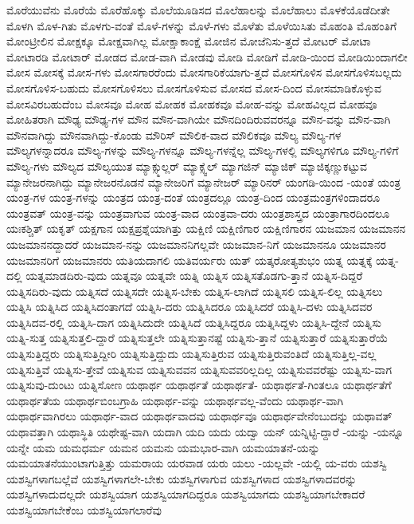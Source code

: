 {ಮೊರೆಯುವೆನು
ಮೊರೆಯೆ
ಮೊರೆಹೊಕ್ಕು
ಮೊಲೆಯೂಡಿಸದ
ಮೊಲೆಹಾಲನ್ನು
ಮೊಲೆಹಾಲು
ಮೊಳಕೆಯೊಡೆದೀತೇ
ಮೊಳಗಿ
ಮೊಳ-ಗಿತು
ಮೊಳಗು-ವಂತೆ
ಮೊಳೆ-ಗಳನ್ನು
ಮೊಳೆ-ಗಳು
ಮೊಳೆತು
ಮೊಳೆಯಿಸಿತು
ಮೊಹಂತಿ
ಮೊಹಂತಿಗೆ
ಮೋಂಟ್ರೀಲಿನ
ಮೋಕ್ಷಕ್ಕೂ
ಮೋಕ್ಷವಾಗಿಲ್ಲ
ಮೋಕ್ಷಾಕಾಂಕ್ಷೆ
ಮೋಜಿನ
ಮೋಜೆನಿಸು-ತ್ತದೆ
ಮೋಟರ್
ಮೋಟಾ
ಮೋಟಾರಡಿ
ಮೋಟಾರ್
ಮೋಡದ
ಮೋಡ-ವಾಗಿ
ಮೋಡವು
ಮೋಡಿ
ಮೋಡಿಗೆ
ಮೋಡಿ-ಯಿಂದ
ಮೋಡಿಯಿಂದಾಗಲೀ
ಮೋಸ
ಮೋಸಕ್ಕೆ
ಮೋಸ-ಗಳು
ಮೋಸಗಾರರೆಂದು
ಮೋಸಗಾರಿಕೆಯಾಗು-ತ್ತದೆ
ಮೋಸಗೊಳಿಸ
ಮೋಸಗೊಳಿಸಬಲ್ಲದು
ಮೋಸಗೊಳಿಸ-ಬಹುದು
ಮೋಸಗೊಳಿಸಲು
ಮೋಸಗೊಳಿಸುವ
ಮೋಸದ
ಮೋಸ-ದಿಂದ
ಮೋಸಮಾಡಿಕೊಳ್ಳುವ
ಮೋಸವಿರಬಹುದೆಂಬ
ಮೋಸವೂ
ಮೋಹ
ಮೋಹಕ
ಮೋಹಕವೂ
ಮೋಹ-ವನ್ನು
ಮೋಹವಿಲ್ಲದ
ಮೋಹವೂ
ಮೋಹಿತರಾಗಿ
ಮೌಢ್ಯ
ಮೌಢ್ಯ-ಗಳ
ಮೌನ
ಮೌನ-ವಾಗಿಯೇ
ಮೌನದಿಂದಿರುವವರನ್ನೂ
ಮೌನ-ವನ್ನು
ಮೌನ-ವಾಗಿ
ಮೌನವಾಗಿದ್ದು
ಮೌನವಾಗಿದ್ದು-ಕೊಂಡು
ಮೌರಿಸ್
ಮೌಲಿಕ-ವಾದ
ಮೌಲಿಕವೂ
ಮೌಲ್ಯ
ಮೌಲ್ಯ-ಗಳ
ಮೌಲ್ಯಗಳನ್ನಾದರೂ
ಮೌಲ್ಯ-ಗಳನ್ನು
ಮೌಲ್ಯ-ಗಳನ್ನೂ
ಮೌಲ್ಯ-ಗಳನ್ನೆಲ್ಲ
ಮೌಲ್ಯ-ಗಳಲ್ಲಿ
ಮೌಲ್ಯಗಳಿಗೂ
ಮೌಲ್ಯ-ಗಳಿಗೆ
ಮೌಲ್ಯ-ಗಳು
ಮೌಲ್ಯದ
ಮೌಲ್ಯಯುತ
ಮ್ಯಾಕ್ಸ್ಮುಲ್ಲರ್
ಮ್ಯಾಕ್ಸ್ವೆಲ್
ಮ್ಯಾಗಜಿನ್
ಮ್ಯಾಜಿಕ್
ಮ್ಯಾಜಿಕ್ಕಣ್ಣುಕಟ್ಟುವ
ಮ್ಯಾನೇಜರನಾಗಿದ್ದು
ಮ್ಯಾನೇಜರನೊಡನೆ
ಮ್ಯಾನೇಜರಿಗೆ
ಮ್ಯಾನೇಜರ್
ಮ್ಯಾರಿನರ್
ಯಂಗಡಿ-ಯಿಂದ
-ಯಂತೆ
ಯಂತ್ರ
ಯಂತ್ರ-ಗಳ
ಯಂತ್ರ-ಗಳನ್ನು
ಯಂತ್ರದ
ಯಂತ್ರ-ದಂತೆ
ಯಂತ್ರದಲ್ಲೂ
ಯಂತ್ರ-ದಿಂದ
ಯಂತ್ರಮಂತ್ರಗಳಿಂದಾದರೂ
ಯಂತ್ರವತ್
ಯಂತ್ರ-ವನ್ನು
ಯಂತ್ರವಾಗುವ
ಯಂತ್ರ-ವಾದ
ಯಂತ್ರವಾ-ದರು
ಯಂತ್ರಶಾಸ್ತ್ರದ
ಯಂತ್ರಾಗಾರದಿಂದಲೂ
ಯಃಕಶ್ಚಿತ್
ಯಕೃತ್
ಯಕ್ಷಗಾನ
ಯಕ್ಷಪ್ರಶ್ನೆಯಾಗಿತ್ತು
ಯಕ್ಷಿಣಿ
ಯಕ್ಷಿಣಿಗಾರ
ಯಕ್ಷಿಣಿಗಾರನ
ಯಜಮಾನ
ಯಜಮಾನನ
ಯಜಮಾನನದ್ದಾದರೆ
ಯಜಮಾನ-ನನ್ನು
ಯಜಮಾನನಿಗಲ್ಲವೇ
ಯಜಮಾನ-ನಿಗೆ
ಯಜಮಾನನೂ
ಯಜಮಾನರ
ಯಜಮಾನರಿಗೆ
ಯಜಮಾನರು
ಯತಿಯದಾಗಲಿ
ಯತಿವರ್ಯರು
ಯತ್
ಯತ್ಕರೋತ್ಯಶುಭಂ
ಯತ್ನ
ಯತ್ನಕ್ಕೆ
ಯತ್ನ-ದಲ್ಲಿ
ಯತ್ನಮಾಡದಿರು-ವುದು
ಯತ್ನವೂ
ಯತ್ನವೇ
ಯತ್ನಿ
ಯತ್ನಿಸ
ಯತ್ನಿಸತೊಡಗು-ತ್ತಾನೆ
ಯತ್ನಿಸ-ದಿದ್ದರೆ
ಯತ್ನಿಸದಿರು-ವುದು
ಯತ್ನಿಸದೆ
ಯತ್ನಿಸದೇ
ಯತ್ನಿಸ-ಬೇಕು
ಯತ್ನಿಸ-ಲಾಗಿದೆ
ಯತ್ನಿಸಲಿ
ಯತ್ನಿಸ-ಲಿಲ್ಲ
ಯತ್ನಿಸಲು
ಯತ್ನಿಸಿ
ಯತ್ನಿಸಿದ
ಯತ್ನಿಸಿದಂತಾಗದೆ
ಯತ್ನಿಸಿ-ದರು
ಯತ್ನಿಸಿದರೂ
ಯತ್ನಿಸಿದರೆ
ಯತ್ನಿಸಿ-ದಳು
ಯತ್ನಿಸಿದವರ
ಯತ್ನಿಸಿದವ-ರಲ್ಲಿ
ಯತ್ನಿಸಿ-ದಾಗ
ಯತ್ನಿಸಿದುದೇ
ಯತ್ನಿಸಿದೆ
ಯತ್ನಿಸಿದ್ದರೂ
ಯತ್ನಿಸಿದ್ದಳು
ಯತ್ನಿಸಿ-ದ್ದೇನೆ
ಯತ್ನಿಸು
ಯತ್ನಿ-ಸುತ್ತ
ಯತ್ನಿಸುತ್ತಲಿ-ದ್ದಾರೆ
ಯತ್ನಿಸುತ್ತಲೇ
ಯತ್ನಿಸುತ್ತಾನಷ್ಟೆ
ಯತ್ನಿಸು-ತ್ತಾನೆ
ಯತ್ನಿಸುತ್ತಾರೆ
ಯತ್ನಿಸುತ್ತಾರೆಯೆ
ಯತ್ನಿಸುತ್ತಿದ್ದರು
ಯತ್ನಿಸುತ್ತಿದ್ದೀರಿ
ಯತ್ನಿಸುತ್ತಿದ್ದುದು
ಯತ್ನಿಸುತ್ತಿರುವ
ಯತ್ನಿಸುತ್ತಿರುವಂತಿದೆ
ಯತ್ನಿಸುತ್ತಿಲ್ಲ-ವಲ್ಲ
ಯತ್ನಿಸುತ್ತಿವೆ
ಯತ್ನಿಸು-ತ್ತೇವೆ
ಯತ್ನಿಸುವ
ಯತ್ನಿಸುವವನ
ಯತ್ನಿಸುವವರಿಲ್ಲದಿಲ್ಲ
ಯತ್ನಿಸುವವರೆಷ್ಟು
ಯತ್ನಿಸು-ವಾಗ
ಯತ್ನಿಸುವು-ದುಂಟು
ಯತ್ನಿಸೋಣ
ಯಥಾರ್ಥ
ಯಥಾರ್ಥತೆ
ಯಥಾರ್ಥತೆ-
ಯಥಾರ್ಥತೆ-ಗಿಂತಲೂ
ಯಥಾರ್ಥತೆಗೆ
ಯಥಾರ್ಥತೆಯ
ಯಥಾರ್ಥಬಿಂಬಗ್ರಾಹಿ
ಯಥಾರ್ಥ-ವನ್ನು
ಯಥಾರ್ಥವಲ್ಲ-ವೆಂದು
ಯಥಾರ್ಥ-ವಾಗಿ
ಯಥಾರ್ಥವಾಗಿರಲು
ಯಥಾರ್ಥ-ವಾದ
ಯಥಾರ್ಥವಾದವು
ಯಥಾರ್ಥವೂ
ಯಥಾರ್ಥವೇನೆಂಬುದನ್ನು
ಯಥಾವತ್
ಯಥಾವತ್ತಾಗಿ
ಯಥಾಸ್ಥಿತಿ
ಯಥೇಷ್ಟ-ವಾಗಿ
ಯದಾಗಿ
ಯದಿ
ಯದು
ಯದ್ವಾ
ಯನ್
ಯನ್ನಿಟ್ಟಿ-ದ್ದಾರೆ
-ಯನ್ನು
-ಯನ್ನೂ
ಯನ್ನೇ
ಯಮ
ಯಮಧರ್ಮ
ಯಮನ
ಯಮನು
ಯಮಭಾರ-ವಾಗಿ
ಯಮಯಾತನೆ-ಯನ್ನು
ಯಮಯಾತನೆಯುಂಟಾಗುತ್ತಿತ್ತು
ಯಮರಾಯ
ಯರವಾಡ
ಯರು
ಯಲು
-ಯಲ್ಲವೇ
-ಯಲ್ಲಿ
ಯ-ವರು
ಯಶಸ್ವಿ
ಯಶಸ್ವಿಗಳಾಗಬಲ್ಲೆವೆ
ಯಶಸ್ವಿಗಳಾಗಲೇ-ಬೇಕು
ಯಶಸ್ವಿಗಳಾಗುವ
ಯಶಸ್ವಿಗಳಾದ
ಯಶಸ್ವಿಗಳಾದವರನ್ನು
ಯಶಸ್ವಿಗಳಾದುದಲ್ಲದೇ
ಯಶಸ್ವಿಯಾಗ
ಯಶಸ್ವಿಯಾಗದಿದ್ದರೂ
ಯಶಸ್ವಿಯಾಗದು
ಯಶಸ್ವಿಯಾಗಬೇಕಾದರೆ
ಯಶಸ್ವಿಯಾಗಬೇಕೆಂಬ
ಯಶಸ್ವಿಯಾಗಲಾರೆವು
}
